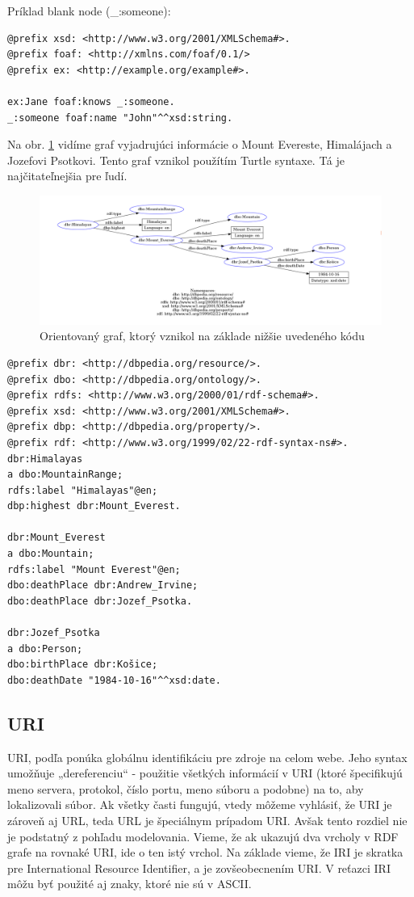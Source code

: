Príklad blank node (\_:someone):
\begin{verbatim}
@prefix xsd: <http://www.w3.org/2001/XMLSchema#>.
@prefix foaf: <http://xmlns.com/foaf/0.1/>
@prefix ex: <http://example.org/example#>.

ex:Jane foaf:knows _:someone.
_:someone foaf:name "John"^^xsd:string.
\end{verbatim}

Na obr. \ref{orientovanyGraf} vidíme graf vyjadrujúci informácie o Mount Evereste, Himalájach a Jozefovi Psotkovi. Tento graf vznikol použítím Turtle syntaxe. Tá je najčitateľnejšia pre ľudí.

\begin{figure}[h]
\centering
\includegraphics[width=\textwidth]{images/orientovanyGraf}
\caption{Orientovaný graf, ktorý vznikol na základe nižšie uvedeného kódu}
\label{orientovanyGraf}
\end{figure}

\begin{verbatim}
@prefix dbr: <http://dbpedia.org/resource/>.
@prefix dbo: <http://dbpedia.org/ontology/>.
@prefix rdfs: <http://www.w3.org/2000/01/rdf-schema#>.
@prefix xsd: <http://www.w3.org/2001/XMLSchema#>.
@prefix dbp: <http://dbpedia.org/property/>.
@prefix rdf: <http://www.w3.org/1999/02/22-rdf-syntax-ns#>.
dbr:Himalayas
a dbo:MountainRange;
rdfs:label "Himalayas"@en;
dbp:highest dbr:Mount_Everest.

dbr:Mount_Everest
a dbo:Mountain;
rdfs:label "Mount Everest"@en;
dbo:deathPlace dbr:Andrew_Irvine;
dbo:deathPlace dbr:Jozef_Psotka.

dbr:Jozef_Psotka
a dbo:Person;
dbo:birthPlace dbr:Košice;
dbo:deathDate "1984-10-16"^^xsd:date.
\end{verbatim}

\subsection{URI} \label{secUri}
URI, podľa \cite{rdf2} ponúka globálnu identifikáciu pre zdroje na celom webe. Jeho syntax
umožňuje „dereferenciu“ - použitie všetkých informácií v URI (ktoré špecifikujú meno
servera, protokol, číslo portu, meno súboru a podobne) na to, aby lokalizovali súbor.
Ak všetky časti fungujú, vtedy môžeme vyhlásiť, že URI je zároveň aj URL, teda
URL je špeciálnym prípadom URI. Avšak tento rozdiel nie je podstatný z pohľadu
modelovania. Vieme, že ak ukazujú dva vrcholy v RDF grafe na rovnaké URI, ide o ten
istý vrchol. Na základe \cite{rdf} vieme, že IRI je skratka pre International Resource Identifier,
a je zovšeobecnením URI. V reťazci IRI môžu byť použité aj znaky, ktoré nie sú v ASCII.

